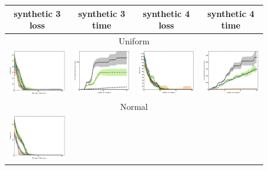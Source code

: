 \documentclass{article}
\renewcommand\[{\begin{equation}}
\renewcommand\]{\end{equation}}
\begin{document}
\begin{figure}[h!]
    \centering
    {\footnotesize
    \begin{tabular}{cccc}
        \hline
        {\sc synthetic 3 loss} & {\sc synthetic 3 time} & {\sc synthetic 4 loss} & {\sc synthetic 4 time}
        \\
        \hline \hline
        \multicolumn{4}{c}{{\sc Uniform}}
        \\
        \includegraphics[width=10em]{figures/synthetic_vs_others_3_uniform_per_iter_loss} &
        \includegraphics[width=10em]{figures/synthetic_vs_others_3_uniform_per_iter_time} &
        \includegraphics[width=10em]{figures/synthetic_vs_others_4_uniform_per_iter_loss} &
        \includegraphics[width=10em]{figures/synthetic_vs_others_4_uniform_per_iter_time}
        \\
        \hline
        \multicolumn{4}{c}{{\sc Normal}}
        \\
        \includegraphics[width=10em]{figures/synthetic_vs_others_3_normal_per_iter_loss} &

\end{tabular}}
\end{figure}
\end{document}
